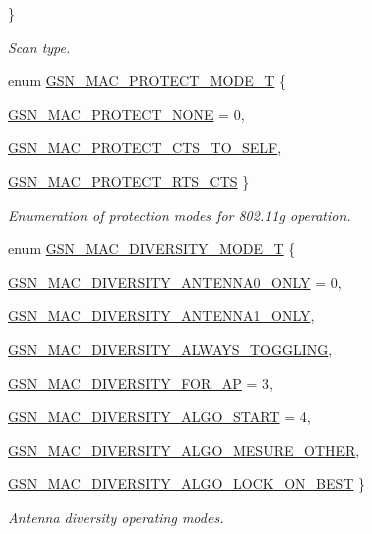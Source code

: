 \begin{DoxyCompactItemize}
 \}
\begin{DoxyCompactList}\small\item\em Scan type. \end{DoxyCompactList}\item 
enum \hyperlink{a00642_gaa470d1007e57e516d1df5e4b8063182f}{GSN\_\-MAC\_\-PROTECT\_\-MODE\_\-T} \{ \par
\hyperlink{a00642_ggaa470d1007e57e516d1df5e4b8063182faebc94a474d588d14f27566401b67ec30}{GSN\_\-MAC\_\-PROTECT\_\-NONE} =  0, 
\par
\hyperlink{a00642_ggaa470d1007e57e516d1df5e4b8063182fac1649209fc916370cf2eb11fdedcaa6f}{GSN\_\-MAC\_\-PROTECT\_\-CTS\_\-TO\_\-SELF}, 
\par
\hyperlink{a00642_ggaa470d1007e57e516d1df5e4b8063182fa1909b4b4f8de41538af85b18c822c8dc}{GSN\_\-MAC\_\-PROTECT\_\-RTS\_\-CTS}
 \}
\begin{DoxyCompactList}\small\item\em Enumeration of protection modes for 802.11g operation. \end{DoxyCompactList}\item 
enum \hyperlink{a00642_gaabd0b61d3828dd59d93bb8be08f10ac6}{GSN\_\-MAC\_\-DIVERSITY\_\-MODE\_\-T} \{ \par
\hyperlink{a00642_ggaabd0b61d3828dd59d93bb8be08f10ac6af0b41fcfdb282436ce96f215518df7b7}{GSN\_\-MAC\_\-DIVERSITY\_\-ANTENNA0\_\-ONLY} =  0, 
\par
\hyperlink{a00642_ggaabd0b61d3828dd59d93bb8be08f10ac6a2108d8a409d1453f2dba556036e7949f}{GSN\_\-MAC\_\-DIVERSITY\_\-ANTENNA1\_\-ONLY}, 
\par
\hyperlink{a00642_ggaabd0b61d3828dd59d93bb8be08f10ac6abf76ce9526e8b9ca1c14fc5bed8215e4}{GSN\_\-MAC\_\-DIVERSITY\_\-ALWAYS\_\-TOGGLING}, 
\par
\hyperlink{a00642_ggaabd0b61d3828dd59d93bb8be08f10ac6a35eadd9c9bd58e7c7dd77f54f9cfa48d}{GSN\_\-MAC\_\-DIVERSITY\_\-FOR\_\-AP} =  3, 
\par
\hyperlink{a00642_ggaabd0b61d3828dd59d93bb8be08f10ac6a55627deea74bcc196d12110f41d7f6a9}{GSN\_\-MAC\_\-DIVERSITY\_\-ALGO\_\-START} =  4, 
\par
\hyperlink{a00642_ggaabd0b61d3828dd59d93bb8be08f10ac6a5eb675197b32e9b6eeab713023e910d9}{GSN\_\-MAC\_\-DIVERSITY\_\-ALGO\_\-MESURE\_\-OTHER}, 
\par
\hyperlink{a00642_ggaabd0b61d3828dd59d93bb8be08f10ac6a8faf40fc52be3915b495936e34a68c14}{GSN\_\-MAC\_\-DIVERSITY\_\-ALGO\_\-LOCK\_\-ON\_\-BEST}
 \}
\begin{DoxyCompactList}\small\item\em Antenna diversity operating modes. \end{DoxyCompactList}\item 

\end{DoxyCompactItemize}
